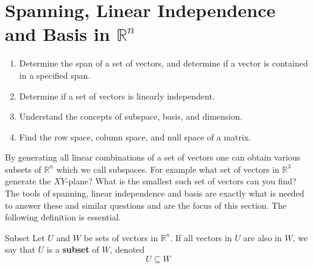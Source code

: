 \newpage
\section{Spanning, Linear Independence and Basis in \texorpdfstring{$\mathbb{R}^{n}$}{Rn}}

\begin{outcome}

\begin{enumerate}
\item[A.] Determine the span of a set of vectors, and determine if a vector is contained in a specified span.

\item[B.] Determine if a set of vectors is linearly independent.

\item[C.] Understand the concepts of subspace, basis, and dimension.

\item[D.] Find the row space, column space, and null space of a matrix.
\end{enumerate}
\end{outcome}

By generating all linear combinations of a set of vectors one can
obtain various subsets of $\mathbb{R}^{n}$ which we call
subspaces. For example what set of vectors in $\mathbb{R}^{3}$
generate the $XY$-plane? What is the smallest such set of vectors can
you find? The tools of spanning, linear independence and basis are
exactly what is needed to answer these and similar questions and are the focus of this section. The following definition is essential.

\begin{definition}{Subset}\label{def:subset}
Let $U$ and $W$ be sets of vectors in $\mathbb{R}^n$. If all vectors in $U$ are also in $W$, we say that $U$ is a \textbf{subset} of $W$, denoted 
\[
U \subseteq W
\]
\end{definition}